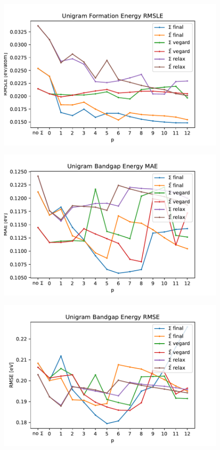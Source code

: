 \documentclass[11pt,oneside,czech,american]{book} %
\theoremstyle{definition} %
\theoremstyle{definition}
\begin{document}
\begin{figure}[H]
	\centering
	\includegraphics[scale=0.6]{unigram_RMSLE_form.pdf}
	\caption{}
	\label{}
\end{figure}
\begin{figure}[H]
	\centering
	\includegraphics[scale=0.6]{unigram_MAE_gap.pdf}
	\caption{}
	\label{}
\end{figure}
\begin{figure}[H]
	\centering
	\includegraphics[scale=0.6]{unigram_RMSE_gap.pdf}
	\caption{}
	\label{}
\end{figure}
\end{document}
